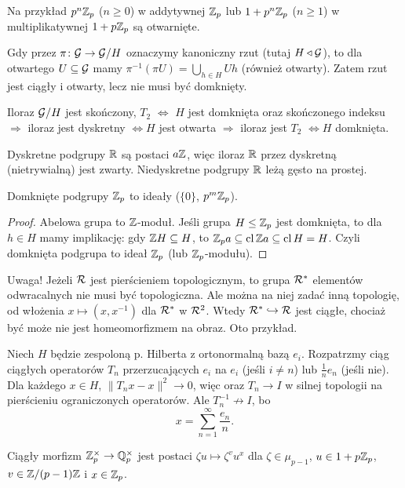 Na przykład $p^n\mathbb Z_p$ ($n \ge 0$) w addytywnej $\mathbb Z_p$ lub $1+p^n \mathbb Z_p$ ($n \ge 1$) w multiplikatywnej $1 + p\mathbb Z_p$ są otwarnięte.

Gdy przez $\pi \colon \mathcal G \to \mathcal G / H$ oznaczymy kanoniczny rzut (tutaj $H \triangleleft \mathcal G$), to dla otwartego $U \subseteq \mathcal G$ mamy $\pi^{-1} (\pi U) = \bigcup_{h \in H} Uh$ (również otwarty).
Zatem rzut jest ciągły i otwarty, lecz nie musi być domknięty.

\begin{fakt}
	Iloraz $\mathcal G/H$ jest skończony, $T_2$ $\Leftrightarrow$ $H$ jest domknięta oraz skończonego indeksu $\Rightarrow$ iloraz jest dyskretny $\Leftrightarrow H$ jest otwarta $\Rightarrow$ iloraz jest $T_2$ $\Leftrightarrow H$ domknięta.
\end{fakt}

Dyskretne podgrupy $\mathbb R$ są postaci $a\mathbb Z$, więc iloraz $\mathbb R$ przez dyskretną (nietrywialną) jest zwarty.
Niedyskretne podgrupy $\mathbb R$ leżą gęsto na prostej.

\begin{fakt}
	Domknięte podgrupy $\mathbb Z_p$ to ideały ($\{0\}$, $p^m \mathbb Z_p$).
\end{fakt}

\begin{proof}
	Abelowa grupa to $\mathbb Z$-moduł.
	Jeśli grupa $H \le \mathbb Z_p$ jest domknięta, to dla $h \in H$ mamy implikację: gdy $\mathbb Z H \subseteq H$, to $\mathbb Z_p a \subseteq \operatorname{cl} \mathbb Z a \subseteq \operatorname{cl} H = H$.
	Czyli domknięta podgrupa to ideał $\mathbb Z_p$ (lub $\mathbb Z_p$-modułu).
\end{proof}

Uwaga!
Jeżeli $\mathcal R$ jest pierścieniem topologicznym, to grupa $\mathcal R^*$ elementów odwracalnych nie musi być topologiczna.
Ale można na niej zadać inną topologię, od włożenia $x \mapsto (x, x^{-1})$ dla $\mathcal R^*$ w $\mathcal R^2$.
Wtedy $\mathcal R^* \hookrightarrow \mathcal R$ jest ciągłe, chociaż być może nie jest homeomorfizmem na obraz.
Oto przykład.

Niech $H$ będzie zespoloną p. Hilberta z ortonormalną bazą $e_i$.
Rozpatrzmy ciąg ciągłych operatorów $T_n$ przerzucających $e_i$ na $e_i$ (jeśli $i \neq n$) lub $\frac 1 n e_n$ (jeśli nie).
Dla każdego $x \in H$, $\|T_n x - x\|^2 \to 0$, więc oraz $T_n \to I$ w silnej topologii na pierścieniu ograniczonych operatorów.
Ale $T_n^{-1} \not \to I$, bo
\[
		x = \sum_{n = 1}^\infty \frac {e_n} n.	
\]

\begin{fakt} %
	Ciągły morfizm $\mathbb Z_p^\times \to \mathbb Q_p^\times$ jest postaci $\zeta u \mapsto \zeta^v u^x$ dla $\zeta \in \mu_{p-1}$, $u \in 1 + p \mathbb Z_p$, $v \in \mathbb Z/(p-1)\mathbb Z$ i $x \in \mathbb Z_p$.
\end{fakt}
